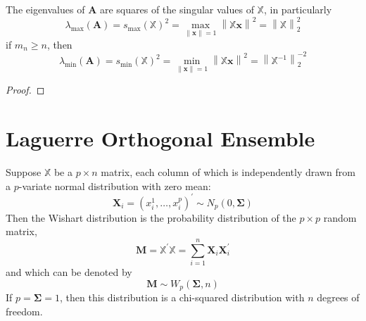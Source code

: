 \begin{theorem}
    The eigenvalues of $\mathbf{A}$ are squares of the singular values of $\mathbb{X}$, in particularly
    \begin{equation*}
        \lambda_{\max}\left(\mathbf{A}\right)=s_{\max}\left(\mathbb{X}\right)^{2}=\max_{\|\mathbf{x}\|=1}\left\|\mathbb{X}\mathbf{x}\right\|^{2}=\left\|\mathbb{X}\right\|_{2}^{2}
    \end{equation*}
    if $m_{n}\geq n$, then
    \begin{equation*}
        \lambda_{\min}\left(\mathbf{A}\right)=s_{\min}\left(\mathbb{X}\right)^{2}=\min_{\|\mathbf{x}\|=1}\left\|\mathbb{X}\mathbf{x}\right\|^{2}=\left\|\mathbb{X}^{-1}\right\|_{2}^{-2}
    \end{equation*}
\end{theorem}

\begin{proof}

\end{proof}

\section{Laguerre Orthogonal Ensemble}

\begin{definition}
    Suppose $\mathbb{X}$ be a $p\times n$ matrix, each column of which is independently drawn from a $p$-variate normal distribution with zero mean:
    \begin{equation*}
        \mathbf{X}_{i}=\left(x_{i}^{1},\ldots,x_{i}^{p}\right)^{\prime}\sim N_{p}(0,\boldsymbol{\Sigma})
    \end{equation*}
    Then the Wishart distribution is the probability distribution of the $p\times p$ random matrix,
    \begin{equation}
        \mathbf{M}=\mathbb{X}^{\prime}\mathbb{X}=\sum_{i=1}^{n}\mathbf{X}_{i}\mathbf{X}_{i}^{\prime}
    \end{equation}
    and which can be denoted by
    \begin{equation*}
        \mathbf{M}\sim W_{p}\left(\boldsymbol{\Sigma},n\right)
    \end{equation*}
    If $p=\boldsymbol{\Sigma}=1$, then this distribution is a chi-squared distribution with $n$ degrees of freedom.
\end{definition}

